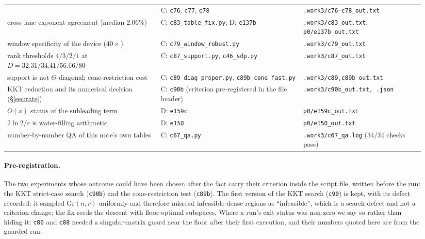 \begin{table}[t]
\begin{tabular}{@{}>{\raggedright\arraybackslash}p{5.2cm}>{\raggedright\arraybackslash}p{5.6cm}>{\raggedright\arraybackslash}p{5.8cm}@{}}
  & C: \texttt{c76}, \texttt{c77}, \texttt{c78}
  & \texttt{.work3/c76--c78\_out.txt} \\
cross-lane exponent agreement (median $2.06\%$)
  & C: \texttt{c83\_table\_fix.py}; D: \texttt{e137b}
  & \texttt{.work3/c83\_out.txt}, \texttt{p0/e137b\_out.txt} \\
window specificity of the device ($40\times$)
  & C: \texttt{c79\_window\_robust.py}
  & \texttt{.work3/c79\_out.txt} \\
rank thresholds $4/3/2/1$ at $D=32.31/34.41/56.66/80$
  & C: \texttt{c87\_support.py}, \texttt{c46\_sdp.py}
  & \texttt{.work3/c87\_out.txt} \\
support is not $\Theta$-diagonal; cone-restriction cost
  & C: \texttt{c89\_diag\_proper.py}, \texttt{c89b\_cone\_fast.py}
  & \texttt{.work3/c89,c89b\_out.txt} \\
KKT reduction and its numerical decision (\S\ref{sec:rate})
  & C: \texttt{c90b} (criterion pre-registered in the file header)
  & \texttt{.work3/c90b\_out.txt, .json} \\
$O(x)$ status of the subleading term
  & D: \texttt{e159c}
  & \texttt{p0/e159c\_out.txt} \\
$2\ln2/r$ is water-filling arithmetic
  & D: \texttt{e150}
  & \texttt{p0/e150\_out.txt} \\
number-by-number QA of this note's own tables
  & C: \texttt{c67\_qa.py}
  & \texttt{.work3/c67\_qa.log} ($34/34$ checks pass) \\
\bottomrule
\end{tabular}
\end{table}

\paragraph{Pre-registration.} The two experiments whose outcome could have been
chosen after the fact carry their criterion inside the script file, written
before the run: the KKT strict-case search (\texttt{c90b}) and the
cone-restriction test (\texttt{c89b}). The first version of the KKT search
(\texttt{c90}) is kept, with its defect recorded: it sampled
$\mathrm{Gr}(n,r)$ uniformly and therefore misread infeasible-dense regions as
``infeasible'', which is a search defect and not a criterion change; the fix
seeds the descent with floor-optimal subspaces. Where a run's exit status was
non-zero we say so rather than hiding it: \texttt{c86} and \texttt{c88} needed a
singular-matrix guard near the floor after their first execution, and their
numbers quoted here are from the guarded run.
